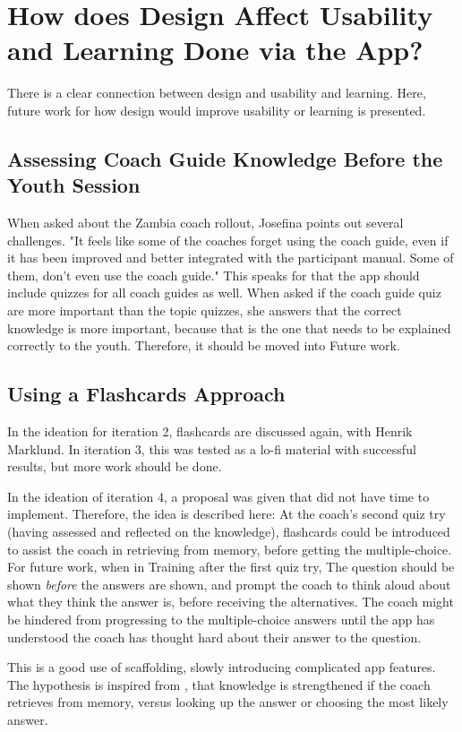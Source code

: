 \section{How does Design Affect Usability and Learning Done via the App?}\label{sec:future-work-4}

There is a clear connection between design and usability and learning. Here, future work for how design would improve usability or learning is presented.

\subsection{Assessing Coach Guide Knowledge Before the Youth Session}
When asked about the Zambia coach rollout, Josefina points out several challenges. "It feels like some of the coaches forget using the coach guide, even if it has been improved and better integrated with the participant manual. Some of them, don't even use the coach guide." This speaks for that the app should include quizzes for all coach guides as well. When asked if the coach guide quiz are more important than the topic quizzes, she answers that the correct knowledge is more important, because that is the one that needs to be explained correctly to the youth. Therefore, it should be moved into Future work.

\subsection{Using a Flashcards Approach}
In the ideation for iteration 2, flashcards are discussed again, with Henrik Marklund. In iteration 3, this was tested as a lo-fi material with successful results, but more work should be done.

In the ideation of iteration 4, a proposal was given that did not have time to implement. Therefore, the idea is described here: At the coach's second quiz try (having assessed and reflected on the knowledge), flashcards could be introduced to assist the coach in retrieving from memory, before getting the multiple-choice. For future work, when in Training after the first quiz try, The question should be shown \textit{before} the answers are shown, and prompt the coach to think aloud about what they think the answer is, before receiving the alternatives. The coach might be hindered from progressing to the multiple-choice answers until the app has understood the coach has thought hard about their answer to the question.

This is a good use of scaffolding, slowly introducing complicated app features. The hypothesis is inspired from \cite{bjork}, that knowledge is strengthened if the coach retrieves from memory, versus looking up the answer or choosing the most likely answer.

